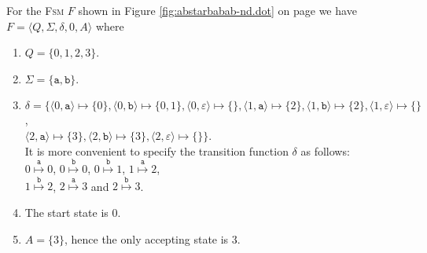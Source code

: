 \exampleEng
For the \textsc{Fsm} $F$ shown in Figure \ref{fig:abstarbabab-nd.dot} on page \pageref{fig:abstarbabab-nd.dot} 
we have
\\[0.2cm]
\hspace*{1.3cm}
$F = \langle Q, \Sigma, \delta, 0, A\rangle$ \quad where
\begin{enumerate}
\item $Q = \{ 0, 1, 2, 3 \}$.
\item $\Sigma = \{ \texttt{a}, \texttt{b} \}$.
\item $\delta = \bigl\{ 
       \langle 0, \texttt{a}  \rangle \mapsto \{ 0 \},
       \langle 0, \texttt{b}  \rangle \mapsto \{ 0, 1 \},
       \langle 0, \varepsilon \rangle \mapsto \{ \},
       \langle 1, \texttt{a}  \rangle \mapsto \{ 2 \},
       \langle 1, \texttt{b}  \rangle \mapsto \{ 2 \},
       \langle 1, \varepsilon \rangle \mapsto \{  \}$,
      \\[0.2cm]
      \hspace*{0.74cm}
      $\langle 2, \texttt{a}  \rangle \mapsto \{ 3 \}, 
       \langle 2, \texttt{b}  \rangle \mapsto \{ 3 \}, 
       \langle 2, \varepsilon \rangle \mapsto \{ \}\bigr\}$.
      \\[0.2cm]
      It is more convenient to specify the transition function $\delta$ as follows:
      \\[0.2cm]
      \hspace*{1.3cm}
       $0 \stackrel{\texttt{a}}{\mapsto} 0$, \quad
       $0 \stackrel{\texttt{b}}{\mapsto} 0$, \quad
       $0 \stackrel{\texttt{b}}{\mapsto} 1$, \quad
       $1 \stackrel{\texttt{a}}{\mapsto} 2$, \quad \\[0.1cm]
      \hspace*{1.3cm}
       $1 \stackrel{\texttt{b}}{\mapsto} 2$, \quad
       $2 \stackrel{\texttt{a}}{\mapsto} 3$ \quad and \quad
       $2 \stackrel{\texttt{b}}{\mapsto} 3$.
\item The start state is $0$.
\item $A = \{ 3 \}$, hence the only accepting state is $3$. \eox
\end{enumerate}
\vspace*{0.3cm}

